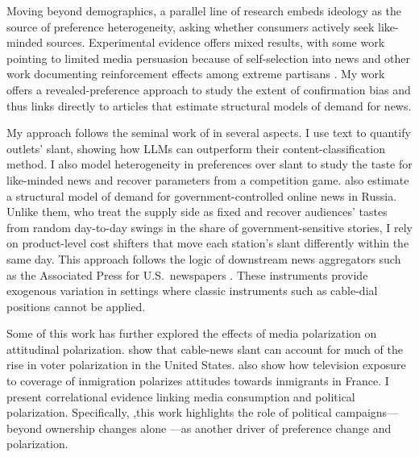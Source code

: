 \documentclass[12pt]{article}
\begin{document}
Moving beyond demographics, a parallel line of research embeds ideology as the source of preference heterogeneity, asking whether consumers actively seek like-minded sources. Experimental evidence offers mixed results, with some work pointing to limited media persuasion because of self-selection into news \citep{arceneaux_johnson_2013} and other work documenting reinforcement effects among extreme partisans \citep{levendusky}. My work offers a revealed-preference approach to study the extent of confirmation bias and thus links directly to articles that estimate structural models of demand for news.


My approach follows the seminal work of \citet{gentzkow2010media} in several aspects. I use text to quantify outlets’ slant, showing how LLMs can outperform their content-classification method. I also model heterogeneity in preferences over slant to study the taste for like-minded news and recover parameters from a competition game. \citet{SimonovRao2022} also estimate a structural model of demand for government-controlled online news in Russia. Unlike them, who treat the supply side as fixed and recover audiences’ tastes from random day-to-day swings in the share of government-sensitive stories, I rely on product-level cost shifters that move each station’s slant differently within the same day. This approach follows the logic of downstream news aggregators such as the Associated Press for U.S.\ newspapers \citep{milena}. These instruments provide exogenous variation in settings where classic instruments such as cable-dial positions \citep{martin2017} cannot be applied.


Some of this work has further explored the effects of media polarization on attitudinal polarization. \citet{martin2017} show that cable-news slant can account for much of the rise in voter polarization in the United States. \cite{schneider2025media} also show how television exposure to coverage of inmigration polarizes attitudes towards inmigrants in France.  I present correlational evidence linking media consumption and political polarization. Specifically, ,this work highlights the role of political campaigns—beyond ownership changes alone \citep{durante2012partisan}—as another driver of preference change and polarization. 
\end{document}
